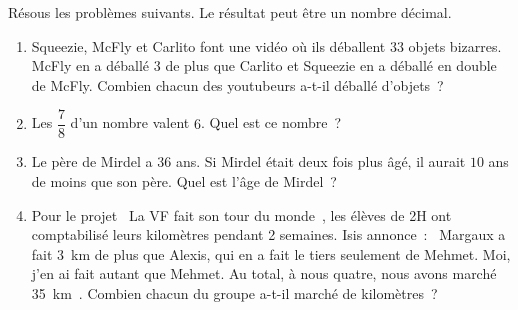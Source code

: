\documentclass[../../syllabus_2.tex]{subfiles}
\begin{document}
\begin{exercise}
  Résous les problèmes suivants. Le résultat peut être un nombre décimal.
  \begin{enumerate}
    \item Squeezie, McFly et Carlito font une vidéo où ils déballent $33$
          objets bizarres. McFly en a déballé $3$ de plus que Carlito et
          Squeezie en a déballé en double de McFly. Combien chacun des
          youtubeurs a-t-il déballé d'objets~?

    \item Les $\dfrac{7}{8}$ d'un nombre valent $6$. Quel est ce nombre~?

    \item Le père de Mirdel a $36$ ans. Si Mirdel était deux fois plus âgé, il
          aurait $10$ ans de moins que son père. Quel est l'âge de Mirdel~?

    \item Pour le projet \og~La VF fait son tour du monde~\fg{}, les élèves de
          2\ieme H ont comptabilisé leurs kilomètres pendant 2
          semaines. Isis annonce~: \og~Margaux a fait \SI{3}{km} de plus que Alexis,
          qui en a fait le tiers seulement de Mehmet. Moi, j'en ai fait autant
          que Mehmet. Au total, à nous quatre, nous avons marché \SI{35}{km}~\fg{}.
          Combien chacun du groupe a-t-il marché de kilomètres~?


\end{enumerate}
\end{exercise}
\end{document}
